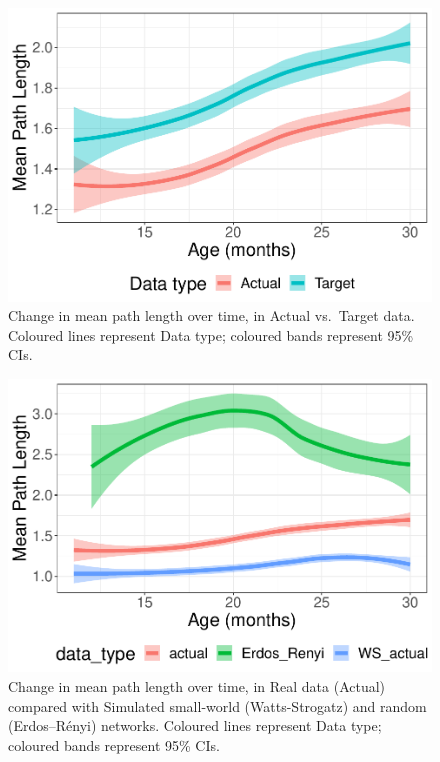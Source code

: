 \documentclass[
  man]{apa6}
\begin{document}
\begin{figure}
\centering
\includegraphics{NetworkGraphs_files/figure-latex/Figure-path-length-DT-1.pdf}
\caption{\label{fig:Figure-path-length-DT}Change in mean path length over time, in Actual vs.~Target data. Coloured lines represent Data type; coloured bands represent 95\% CIs.}
\end{figure}

\begin{figure}
\centering
\includegraphics{NetworkGraphs_files/figure-latex/Figure-path-length-all-1.pdf}
\caption{\label{fig:Figure-path-length-all}Change in mean path length over time, in Real data (Actual) compared with Simulated small-world (Watts-Strogatz) and random (Erdos--Rényi) networks. Coloured lines represent Data type; coloured bands represent 95\% CIs.}
\end{figure}
\end{document}
